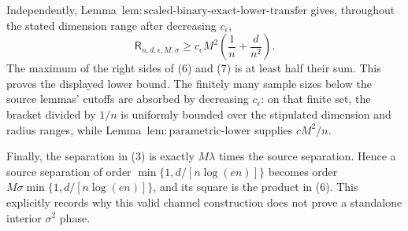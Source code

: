 Independently, Lemma~\(\mathrm{lem:scaled\text{-}binary\text{-}exact\text{-}lower\text{-}transfer}\) gives, throughout the stated dimension range after decreasing \(c_{\epsilon}\),
\[
 \mathsf R_{n,d,\epsilon,M,\sigma}
 \ge c_{\epsilon}M^2\left(\frac1n+\frac d{n^2}\right).
\tag{7}
\]
The maximum of the right sides of (6) and (7) is at least half their sum.  This proves the displayed lower bound.  The finitely many sample sizes below the source lemmas' cutoffs are absorbed by decreasing \(c_{\epsilon}\): on that finite set, the bracket divided by \(1/n\) is uniformly bounded over the stipulated dimension and radius ranges, while Lemma~\(\mathrm{lem:parametric\text{-}lower}\) supplies \(cM^2/n\).

Finally, the separation in (3) is exactly \(M\lambda\) times the source separation.  Hence a source separation of order \(\min\{1,d/[n\log(en)]\}\) becomes order \(M\sigma\min\{1,d/[n\log(en)]\}\), and its square is the product in (6).  This explicitly records why this valid channel construction does not prove a standalone interior \(\sigma^2\) phase.